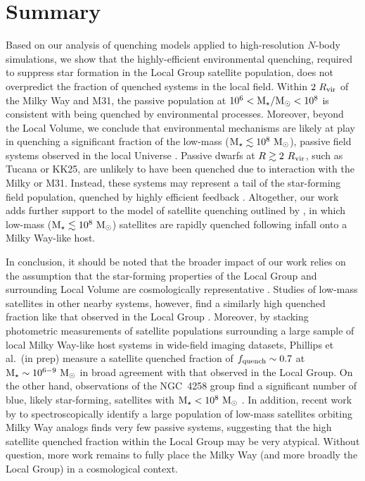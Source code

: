 \section{Summary}
\label{sec:endgame}

Based on our analysis of quenching models applied to high-resolution $N$-body
simulations, we show that the highly-efficient environmental quenching, required
to suppress star formation in the Local Group satellite population, does not
overpredict the fraction of quenched systems in the local field. Within
$2~R_{\rm{vir}}$ of the Milky Way and M31, the passive population at
$10^{6} < {\rm M}_{\star}/{\rm M}_{\odot} < 10^{8}$ is consistent with being quenched by
environmental processes.
%
Moreover, beyond the Local Volume, we conclude that environmental mechanisms are
likely at play in quenching a significant fraction of the low-mass
(${\rm M}_{\star} \lesssim 10^{8}~{\rm M}_{\odot}$), passive field systems observed in the local
Universe \citep[see also][]{simpson18}.
%
Passive dwarfs at $R \gtrsim 2~R_{\rm{vir}}$, such as Tucana or KK25, are unlikely to
have been quenched due to interaction with the Milky or M31. Instead, these
systems may represent a tail of the star-forming field population, quenched by
highly efficient feedback \citep[e.g.][]{nihao1, dicintio17, fitts17}.
%
Altogether, our work adds further support to the model of satellite quenching
outlined by \citet{fham15, fham16}, in which low-mass
(${\rm M}_{\star} \lesssim 10^{8}~{\rm M}_{\odot}$) satellites are rapidly quenched following
infall onto a Milky Way-like host.
%


In conclusion, it should be noted that the broader impact of our work relies on
the assumption that the star-forming properties of the Local Group and
surrounding Local Volume are cosmologically representative \citep[i.e.~are not
atypical,][]{bk16}. 
%
Studies of low-mass satellites in other nearby systems, however, find a
similarly high quenched fraction like that observed in the Local Group
\citep[e.g.][]{kaisin13}. 
%
Moreover, by stacking photometric measurements of satellite
populations surrounding a large sample of local Milky Way-like host
systems in wide-field imaging datasets, Phillips et al.~(in prep)
measure a satellite quenched fraction of $f_{\rm quench} \sim 0.7$ at
${\rm M}_{\star} \sim 10^{6-9}~{\rm M}_{\odot}$ in broad agreement with that observed in
the Local Group. 
%
On the other hand, observations of the NGC~4258 group find a significant number
of blue, likely star-forming, satellites with ${\rm M}_{\star} < 10^{8}~{\rm M}_{\odot}$
\citep{spencer14}. In addition, recent work by \citet{geha17} to
spectroscopically identify a large population of low-mass satellites orbiting
Milky Way analogs finds very few passive systems, suggesting that the high
satellite quenched fraction within the Local Group may be very atypical. Without
question, more work remains to fully place the Milky Way (and more broadly the
Local Group) in a cosmological context.



